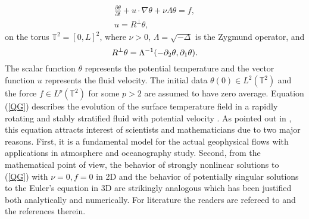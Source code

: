 \documentclass{amsart}
\newcommand{\bg}{\begin{equation}}
\newcommand{\ed}{\end{equation}}
\numberwithin{Theorem}{section}
\theoremstyle{definition}
\theoremstyle{remark}
\renewcommand{\th}{\theta}
\begin{document}
\begin{equation}\begin{split}\label{QG}
\frac{\partial\theta}{\partial t}+u\cdot\nabla \theta+\nu\Lambda\theta =f,\\
u=R^\perp\theta,
\end{split}
\end{equation}
on the torus $\mathbb T^2=[0,L]^2$, where $\nu>0$, $\Lambda=\sqrt{-\Delta}$ is the Zygmund operator, and
\bg\notag
R^\perp\theta=\Lambda^{-1}(-\partial_2\theta,\partial_1\theta).
\ed
The scalar function $\theta$ represents the potential temperature and the vector function $u$ represents the fluid velocity. 
The initial data $\th(0) \in L^2(\mathbb{T}^2)$ and the force $f \in L^p(\mathbb{T}^2)$ for some $p>2$ are assumed to have zero average.
Equation (\ref{QG}) describes the evolution of the surface temperature field in a rapidly rotating and stably stratified fluid with potential velocity \cite{CMT}. As pointed out in \cite{CMT}, this equation attracts interest of  scientists and mathematicians due to two major reasons. First, it is a fundamental model for the actual geophysical flows with applications in atmosphere and oceanography study. Second, from the mathematical point of view, the behavior of strongly nonlinear solutions to (\ref{QG}) with $\nu=0, f=0$ in 2D and the behavior of potentially singular solutions to the Euler's equation in 3D are strikingly analogous which has been justified both analytically and numerically. For literature the readers are refereed to \cite{CCW, CMT, CW, Pe} and the references therein. 
\end{document}
